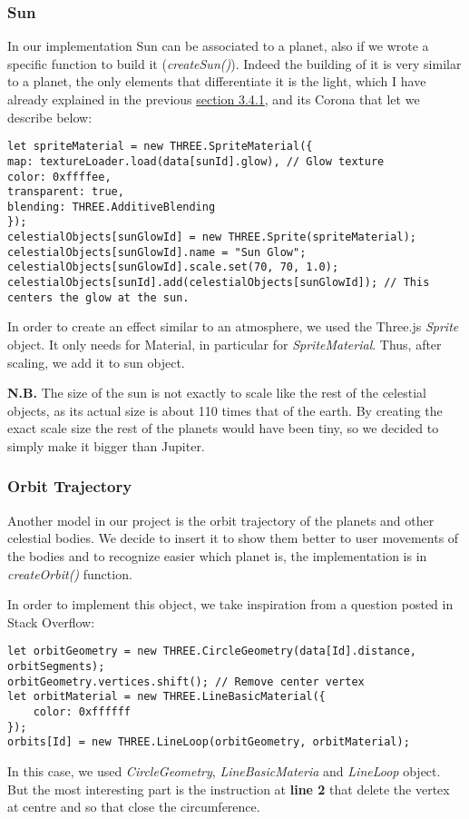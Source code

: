 \documentclass{article}
\begin{document}
\subsubsection{Sun}
In our implementation Sun can be associated to a planet, also if we wrote a specific function to build it (\textit{createSun()}). Indeed the building of it is very similar to a planet, the only elements that differentiate it is the light, which I have already explained in the previous \hyperref[subsec:pointlight]{section 3.4.1}, and its Corona that let we describe below:
\begin{lstlisting}
let spriteMaterial = new THREE.SpriteMaterial({
map: textureLoader.load(data[sunId].glow), // Glow texture
color: 0xffffee,
transparent: true,
blending: THREE.AdditiveBlending
});
celestialObjects[sunGlowId] = new THREE.Sprite(spriteMaterial);
celestialObjects[sunGlowId].name = "Sun Glow";
celestialObjects[sunGlowId].scale.set(70, 70, 1.0);
celestialObjects[sunId].add(celestialObjects[sunGlowId]); // This centers the glow at the sun.
\end{lstlisting}
In order to create an effect similar to an atmosphere, we used the Three.js \textit{Sprite}\cite{documentation:threejs} object. It only needs for Material, in particular for \textit{SpriteMaterial}\cite{documentation:threejs}. Thus, after scaling, we add it to sun object.
\par \textbf{N.B.} The size of the sun is not exactly to scale like the rest of the celestial objects, as its actual size is about 110 times that of the earth. By creating the exact scale size the rest of the planets would have been tiny, so we decided to simply make it bigger than Jupiter.

\subsubsection{Orbit Trajectory}
Another model in our project is the orbit trajectory of the planets and other celestial bodies. We decide to insert it to show them better to user movements of the bodies and to recognize easier which planet is, the implementation is in \textit{createOrbit()} function. 
\par In order to implement this object, we take inspiration from a question posted in Stack Overflow\cite{trajectory:stackoverflow}:
\begin{lstlisting}
let orbitGeometry = new THREE.CircleGeometry(data[Id].distance, orbitSegments);
orbitGeometry.vertices.shift(); // Remove center vertex
let orbitMaterial = new THREE.LineBasicMaterial({
	color: 0xffffff
});
orbits[Id] = new THREE.LineLoop(orbitGeometry, orbitMaterial);
\end{lstlisting}
In this case, we used \textit{CircleGeometry}\cite{documentation:threejs}, \textit{LineBasicMateria}\cite{documentation:threejs} and \textit{LineLoop}\cite{documentation:threejs} object. But the most interesting part is the instruction at \textbf{line 2} that delete the vertex at centre and so that close the circumference.
\end{document}
